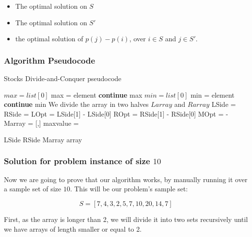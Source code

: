 \documentclass{article}
\begin{document}
\begin{itemize}
 \item The optimal solution on $S$
 \item The optimal solution on $S'$
 \item the optimal solution of $p(j)-p(i)$, over $i \in S$ and $j \in S'$.
\end{itemize}

\subsubsection*{Algorithm Pseudocode}

\begin{algorithm}[H]
\caption{Stocks Divide-and-Conquer pseudocode}
\begin{algorithmic}[1]
 \State $max = list[0]$
   \State max = element
  \Else{}
   \State \textbf{continue}
  \EndIf
 \EndFor
 \State \Return max
\EndFunction
{}
 \State $min = list[0]$
   \State min = element
  \Else{}
   \State \textbf{continue}
  \EndIf
 \EndFor
 \State \Return min
\EndFunction
{}
 \State We divide the array in two halves $Larray$ and $Rarray$
 \State LSide = 
 \State RSide = 
 \State LOpt = LSide[1] - LSide[0]
 \State ROpt = RSide[1] - RSide[0]
 \State MOpt =  - 
 \State Marray = [,]
 \State maxvalue = 

  \State \Return LSide
  \State \Return RSide
  \State \Return Marray
 \EndIf
{}
 \State \Return array
\EndIf
\EndFunction
\end{algorithmic}
\end{algorithm}

\subsubsection*{Solution for problem instance of size $10$}

Now we are going to prove that our algorithm works, by manually running it over a sample set of size $10$. This will be our problem's sample set:

$$S = [7,4,3,2,5,7,10,20,14,7]$$

First, as the array is longer than 2, we will divide it into two sets recursively until we have arrays of length smaller or equal to 2.
\end{document}
